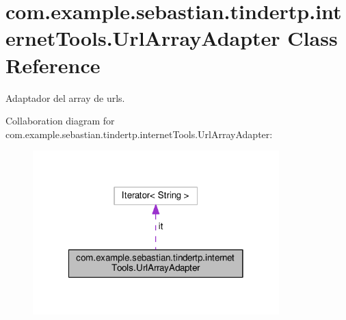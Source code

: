 \hypertarget{classcom_1_1example_1_1sebastian_1_1tindertp_1_1internetTools_1_1UrlArrayAdapter}{}\section{com.\+example.\+sebastian.\+tindertp.\+internet\+Tools.\+Url\+Array\+Adapter Class Reference}
\label{classcom_1_1example_1_1sebastian_1_1tindertp_1_1internetTools_1_1UrlArrayAdapter}


Adaptador del array de urls.  




Collaboration diagram for com.\+example.\+sebastian.\+tindertp.\+internet\+Tools.\+Url\+Array\+Adapter\+:
\nopagebreak
\begin{figure}[H]
\begin{center}
\leavevmode
\includegraphics[width=270pt]{classcom_1_1example_1_1sebastian_1_1tindertp_1_1internetTools_1_1UrlArrayAdapter__coll__graph}
\end{center}
\end{figure}
